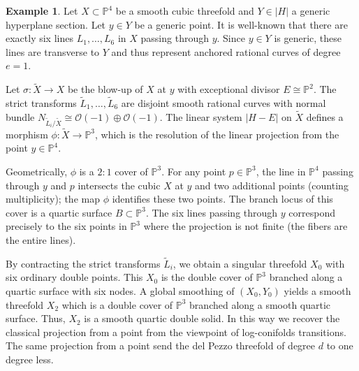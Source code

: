 \documentclass[11pt]{article}
\theoremstyle{definition}
\newtheorem{ex}[thm]{Example}
\newcommand{\abs}[1]{\left\vert#1\right\vert}
\newcommand{\OO}{\mathcal{O}}
\newcommand{\PP}{\mathbb{P}}
\begin{document}
\begin{ex} \label{ex:cubic_to_double_solid}
Let $X \subset \PP^4$ be a smooth cubic threefold and $Y \in \abs{H}$ a generic hyperplane section. Let $y \in Y$ be a generic point. It is well-known that there are exactly six lines $L_1, \dots, L_6$ in $X$ passing through $y$. Since $y \in Y$ is generic, these lines are transverse to $Y$ and thus represent anchored rational curves of degree $e=1$.

Let $\sigma: \tilde{X} \to X$ be the blow-up of $X$ at $y$ with exceptional divisor $E \cong \PP^2$. The strict transforms $\tilde{L}_1, \dots, \tilde{L}_6$ are disjoint smooth rational curves with normal bundle $N_{\tilde{L}_i/\tilde{X}} \cong \OO(-1) \oplus \OO(-1)$. The linear system $\abs{H-E}$ on $\tilde{X}$ defines a morphism $\phi: \tilde{X} \to \PP^3$, which is the resolution of the linear projection from the point $y \in \PP^4$. 

Geometrically, $\phi$ is a $2:1$ cover of $\PP^3$. For any point $p \in \PP^3$, the line in $\PP^4$ passing through $y$ and $p$ intersects the cubic $X$ at $y$ and two additional points (counting multiplicity); the map $\phi$ identifies these two points. The branch locus of this cover is a quartic surface $B \subset \PP^3$. The six lines passing through $y$ correspond precisely to the six points in $\PP^3$ where the projection is not finite (the fibers are the entire lines). 

By contracting the strict transforms $\tilde{L}_i$, we obtain a singular threefold $X_0$ with six ordinary double points. This $X_0$ is the double cover of $\PP^3$ branched along a quartic surface with six nodes. A global smoothing of $(X_0, Y_0)$ yields a smooth threefold $X_2$ which is a double cover of $\PP^3$ branched along a smooth quartic surface. Thus, $X_2$ is a smooth quartic double solid. In this way we recover the classical projection from a point from the viewpoint of log-conifolds transitions.
The same projection from a point send the del Pezzo threefold of degree $d$ to one degree less. 
\end{ex}
\end{document}
